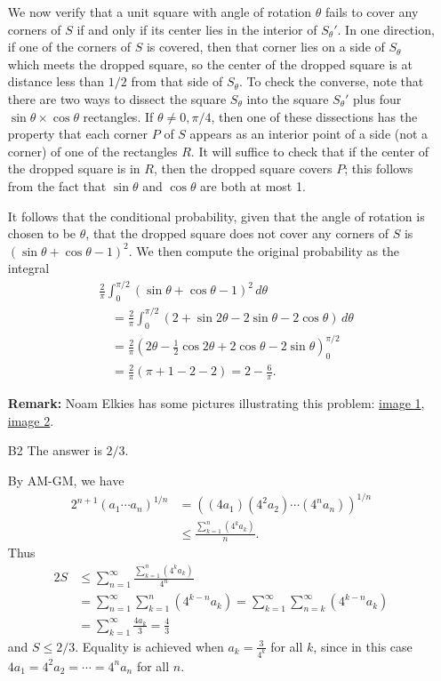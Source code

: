 \documentclass[amssymb,twocolumn,pra,10pt,aps]{revtex4-1}
\begin{document}
\begin{itemize}
We now verify that a unit square with angle of rotation $\theta$ fails to cover any corners of $S$ if and only if its center lies in the interior of $S_\theta'$. In one direction, if one of the corners of $S$ is covered, then that corner lies on a side of $S_\theta$ which meets the dropped square, so the center of the dropped square is at distance less than $1/2$ from that side of $S_\theta$.
To check the converse, note that
there are two ways to dissect the square $S_\theta$ into the square $S_\theta'$ plus four $\sin \theta \times \cos \theta$ rectangles. If $\theta \neq 0, \pi/4$, then one of these dissections
has the property that each corner $P$ of $S$ appears as an interior point of a side (not a corner) of one of the rectangles $R$. 
It will suffice to check that if the center of the dropped square is in $R$, then the dropped square covers $P$; this follows from the fact that $\sin \theta$ and $\cos \theta$ are both at most 1.

It follows that the conditional probability, given that the angle of rotation is chosen to be $\theta$, that the dropped square does not cover any corners of $S$ is $(\sin \theta + \cos \theta - 1)^2$. We then compute the original probability as the integral
\begin{align*}
&\frac{2}{\pi} \int_0^{\pi/2} (\sin \theta + \cos \theta - 1)^2\,d\theta \\
&\quad =
\frac{2}{\pi} \int_0^{\pi/2} (2 + \sin 2\theta - 2\sin \theta - 2 \cos \theta)\,d\theta\\
&\quad = \frac{2}{\pi} \left( 2 \theta - \frac{1}{2} \cos 2\theta + 2 \cos \theta - 2 \sin \theta \right)_0^{\pi/2} \\
&\quad = \frac{2}{\pi} \left( \pi + 1 - 2 - 2 \right) = 2 - \frac{6}{\pi}.
\end{align*}

\noindent
\textbf{Remark:} Noam Elkies has some pictures illustrating this problem:
\href{https://abel.math.harvard.edu/~elkies/putnam_b1a.pdf}{image 1},
\href{https://abel.math.harvard.edu/~elkies/putnam_b1.pdf}{image 2}.

\item[B2]
The answer is $2/3$. 

By AM-GM, we have
\begin{align*}
2^{n+1}(a_1\cdots a_n)^{1/n} &= \left((4a_1)(4^2a_2)\cdots (4^na_n)\right)^{1/n}\\
& \leq \frac{\sum_{k=1}^n (4^k a_k)}{n}.
\end{align*}
Thus
\begin{align*}
2S &\leq \sum_{n=1}^\infty \frac{\sum_{k=1}^n (4^k a_k)}{4^n} \\
&= \sum_{n=1}^\infty \sum_{k=1}^n (4^{k-n}a_k) = \sum_{k=1}^\infty \sum_{n=k}^\infty (4^{k-n}a_k) \\
&= \sum_{k=1}^\infty \frac{4a_k}{3}  = \frac{4}{3}
\end{align*}
and $S \leq 2/3$. Equality is achieved when $a_k=\frac{3}{4^k}$ for all $k$, since in this case $4a_1=4^2a_2=\cdots=4^na_n$ for all $n$.


\end{itemize}
\end{document}
